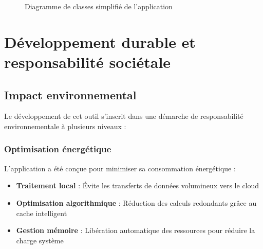 \documentclass[11pt,a4paper]{report}
\begin{document}
\begin{figure}[htbp]
\caption{Diagramme de classes simplifié de l'application}
\end{figure}

\newpage

\chapter{Développement durable et responsabilité sociétale}

\section{Impact environnemental}

Le développement de cet outil s'inscrit dans une démarche de responsabilité environnementale à plusieurs niveaux :

\subsection{Optimisation énergétique}

L'application a été conçue pour minimiser sa consommation énergétique :

\begin{itemize}
\item \textbf{Traitement local} : Évite les transferts de données volumineux vers le cloud
\item \textbf{Optimisation algorithmique} : Réduction des calculs redondants grâce au cache intelligent
\item \textbf{Gestion mémoire} : Libération automatique des ressources pour réduire la charge système
\end{itemize}
\end{document}
